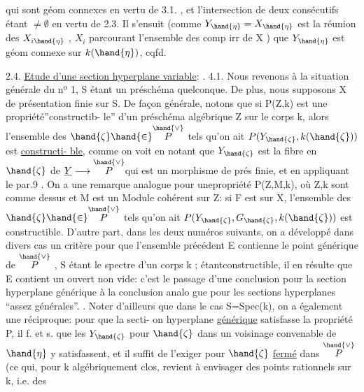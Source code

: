 
qui sont géom connexes en vertu de 3.1. , et  l'intersection
de deux consécutifs étant $\neq \emptyset$ en vertu de 2.3. Il s'ensuit (comme
$Y_{\hand{\eta}} = X_{\hand{\eta}}$ est la réunion des $X_{i\hand{\eta}}$ , $X_i$ parcourant l'ensemble des comp
irr de X ) que  $Y_{\hand{\eta}}$ est géom connexe sur $k(\hand{\eta})$, cqfd.

2.4. \uline{Etude d'une section hyperplane variable}:  .
4.1.
Nous revenons à la situation générale du nº 1, S étant un préschéma
quelconque. De plus, nous supposons X de présentation finie sur S.
De façon générale, notons que si P(Z,k) est une propriété''constructib-%
le''  d'un préschéma algébrique Z sur le corps k,
alors l'ensemble des $\hand{\zeta} \hand{\in} \overset{\hand{\vee}}{P}$ tels qu'on ait $P(Y_{\hand{\zeta}},k(\hand{\zeta}))$ est \uline{constructi-%
ble}, comme on voit en notant que $Y_{\hand{\zeta}}$ est la fibre en $\hand{\zeta}$ de $\underline{Y} \longrightarrow \overset{\hand{\vee}}{P}$\hand{,}qui
est un morphisme de prés finie, et en appliquant le par.9 . On a une
remarque analogue pour une\hand{|}propriété P(Z,M,k), où Z,k sont comme dessus
et M est un Module cohérent sur Z: si F est  sur X, l'ensemble
des $\hand{\zeta} \hand{\in} \overset{\hand{\vee}}{P}$ tels qu'on ait $P(Y_{\hand{\zeta}},G_{\hand{\zeta}},k(\hand{\zeta}))$ est constructible. D'autre
part, dans les deux numéros suivants, on a développé  dans divers
cas un critère pour que l'ensemble précédent E contienne le point
générique de $\overset{\hand{\vee}}{P}$ , S étant le spectre d'un corps k ; étantconstructible,
il en résulte que E contient un ouvert non vide: c'est le passage d'une
conclusion pour la section hyperplane générique à la conclusion analo
gue pour les sections hyperplanes ``assez générales''.  \hand{[}\hand{]}. Noter d'ailleurs que \margin{$\downarrow$}
dans le cas S=Spec(k), on a également une réciproque: pour que la secti-%
on hyperplane \uline{générique} satisfasse la propriété P, il f. et s. que
les $Y_{\hand{\zeta}}$ pour $\hand{\zeta}$ dans un voisinage convenable de $\hand{\eta}$ y satisfassent, et il
suffit de l'exiger pour $\hand{\zeta}$ \uline{fermé} dans $\overset{\hand{\vee}}{P}$ (ce qui, pour k algébriquement
clos, revient à envisager des points rationnels sur k, i.e. des

